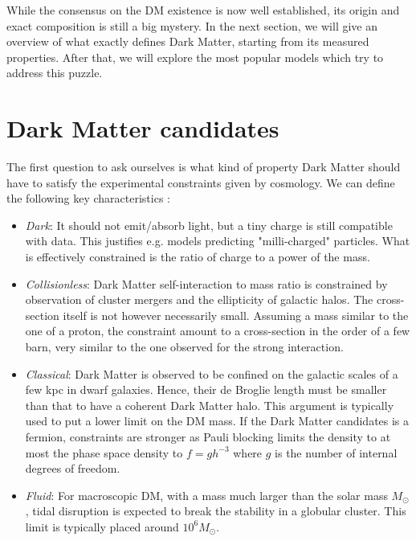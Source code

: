 While the consensus on the DM  existence is now well established, its origin and exact composition is still a big mystery. In the next section, we will give an overview of what exactly defines Dark Matter, starting from its measured properties. After that, we will explore the most popular models which try to address this puzzle.

\section{Dark Matter candidates}
\label{ch1:sec:dm-candidates}

The first question to ask ourselves is what kind of property Dark Matter should have to satisfy the experimental constraints given by cosmology. We can define the following key characteristics \cite{Profumo:2019ujg}:

\begin{itemize}
\item \textit{Dark}: It should not emit/absorb light, but a tiny charge is still compatible with data. This justifies e.g. models predicting "milli-charged" particles. What is effectively constrained is the ratio of charge to a power of the mass.
\item \textit{Collisionless}: Dark Matter self-interaction to mass ratio is constrained by observation of cluster mergers and the ellipticity of galactic halos. The cross-section itself is not however necessarily small. Assuming a mass similar to the one of a proton, the constraint amount to a cross-section in the order of a few barn, very similar to the one observed for the strong interaction.
\item \textit{Classical}: Dark Matter is observed to be confined on the galactic scales of a few kpc in dwarf galaxies. Hence, their de Broglie length must be smaller than that to have a coherent Dark Matter halo. This argument is typically used to put a lower limit on the DM mass. If the Dark Matter candidates is a fermion, constraints are stronger as Pauli blocking limits the density to at most the phase space density to $f=gh^{-3}$ where $g$ is the number of internal degrees of freedom.
\item \textit{Fluid}: For macroscopic DM, with a mass much larger than the solar mass $M_{\odot}$, tidal disruption is expected to break the stability in a globular cluster. This limit is typically placed around $10^6 M_{\odot}$.
\end{itemize}

